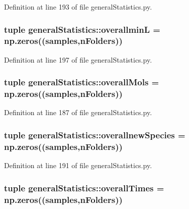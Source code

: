 \-Definition at line 193 of file general\-Statistics.\-py.

\hypertarget{namespacegeneral_statistics_acfe28cce0c9a412ed8f1fa674038556e}{
\subsubsection[{overallmin\-L}]{\setlength{\rightskip}{0pt plus 5cm}tuple {\bf general\-Statistics\-::overallmin\-L} = np.\-zeros(({\bf samples},{\bf n\-Folders}))}}\label{namespacegeneral_statistics_acfe28cce0c9a412ed8f1fa674038556e}


\-Definition at line 197 of file general\-Statistics.\-py.

\hypertarget{namespacegeneral_statistics_afab120e1b028a2a67fde971820733047}{
\subsubsection[{overall\-Mols}]{\setlength{\rightskip}{0pt plus 5cm}tuple {\bf general\-Statistics\-::overall\-Mols} = np.\-zeros(({\bf samples},{\bf n\-Folders}))}}\label{namespacegeneral_statistics_afab120e1b028a2a67fde971820733047}


\-Definition at line 187 of file general\-Statistics.\-py.

\hypertarget{namespacegeneral_statistics_ad59fdb746c72780e836c7a5fcf5bf619}{
\subsubsection[{overallnew\-Species}]{\setlength{\rightskip}{0pt plus 5cm}tuple {\bf general\-Statistics\-::overallnew\-Species} = np.\-zeros(({\bf samples},{\bf n\-Folders}))}}\label{namespacegeneral_statistics_ad59fdb746c72780e836c7a5fcf5bf619}


\-Definition at line 191 of file general\-Statistics.\-py.

\hypertarget{namespacegeneral_statistics_a7a09c1a430c7f4d0a7a65e70d54651a0}{
\subsubsection[{overall\-Times}]{\setlength{\rightskip}{0pt plus 5cm}tuple {\bf general\-Statistics\-::overall\-Times} = np.\-zeros(({\bf samples},{\bf n\-Folders}))}}\label{namespacegeneral_statistics_a7a09c1a430c7f4d0a7a65e70d54651a0}


